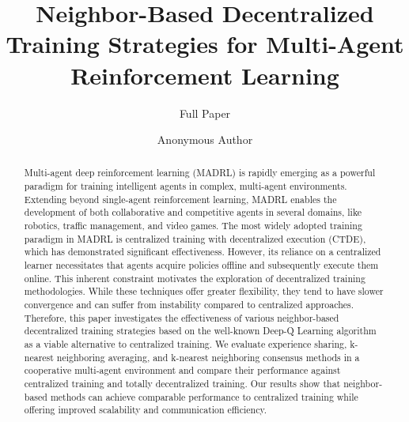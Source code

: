 \documentclass[sigconf]{acmart}
\begin{document}
\title{Neighbor-Based Decentralized Training Strategies for Multi-Agent Reinforcement Learning}
\subtitle{Full Paper}
  
\renewcommand{\shorttitle}{SIG Proceedings Paper in LaTeX Format}





\author{Anonymous Author}
\renewcommand{\shortauthors}{A. Author et al.}

\begin{abstract}
Multi-agent deep reinforcement learning (MADRL) is rapidly emerging as a powerful paradigm for training intelligent agents in complex, multi-agent environments.
%
Extending beyond single-agent reinforcement learning, MADRL enables the development  of both collaborative and competitive agents in several domains, like robotics, traffic management, and video games.
%
The most widely adopted training paradigm in MADRL is centralized training with decentralized execution (CTDE), which has demonstrated significant effectiveness. 
%
However, its reliance on a centralized learner necessitates that agents acquire policies offline and subsequently execute them online. 
This inherent constraint motivates the exploration of decentralized training methodologies.
%
While these techniques offer greater flexibility, they tend to have slower convergence and can suffer from instability compared to centralized approaches.
%
Therefore, this paper investigates the effectiveness of various neighbor-based decentralized training strategies based 
  on the well-known Deep-Q Learning algorithm as a viable alternative to centralized training. 
%  
We evaluate experience sharing, k-nearest neighboring averaging, and k-nearest neighboring consensus methods 
  in a cooperative multi-agent environment and compare their performance against centralized training
  and totally decentralized training. 
%  
Our results show that neighbor-based methods can achieve comparable performance to centralized training 
  while offering improved scalability and communication efficiency. 
%
\end{abstract}
\end{document}
